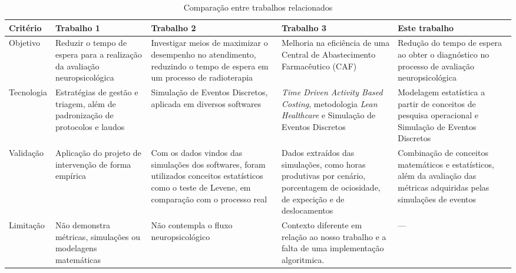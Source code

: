 \documentclass[
    12pt,                %
    openright,           %
    oneside,             %
    a4paper,             %
    english,             %
    brazil               %
]{abntex2}
\begin{document}
\begin{table}[H]
    \centering
    \caption{Comparação entre trabalhos relacionados}
    \label{tab:trabalhos_relacionados}
    
    \tiny %
    
    \setlength{\tabcolsep}{4pt} %
    
    \begin{tabularx}{\textwidth}{p{1.5cm}|Y|Y|Y|Y}
        \toprule
        \textbf{Critério} & \textbf{Trabalho 1} & \textbf{Trabalho 2} & \textbf{Trabalho 3} & \textbf{Este trabalho} \\
        \midrule

        Objetivo 
        & Reduzir o tempo de espera para a realização da avaliação neuropsicológica 
        & Investigar meios de maximizar o desempenho no atendimento, reduzindo o tempo de espera em um processo de radioterapia 
				& Melhoria na eficiência de uma Central de Abastecimento Farmacêutico (CAF)
        & Redução do tempo de espera ao obter o diagnóstico no processo de avaliação neuropsicológica \\
        \midrule

        Tecnologia 
        & Estratégias de gestão e triagem, além de padronização de protocolos e laudos
				& Simulação de Eventos Discretos, aplicada em diversos softwares 
				& \textit{Time Driven Activity Based Costing}, metodologia \textit{Lean Healthcare} e Simulação de Eventos Discretos
        & Modelagem estatística a partir de conceitos de pesquisa operacional e Simulação de Eventos Discretos \\
        \midrule

        Validação 
        & Aplicação do projeto de intervenção de forma empírica
        & Com os dados vindos das simulações dos softwares, foram utilizados conceitos estatísticos como o teste de Levene, em comparação com o processo real
        & Dados extraídos das simulações, como horas produtivas por cenário, porcentagem de ociosidade, de expecição e de deslocamentos
        & Combinação de conceitos matemáticos e estatísticos, além da avaliação das métricas adquiridas pelas simulações de eventos \\
        \midrule

        Limitação 
        & Não demonstra métricas, simulações ou modelagens matemáticas
        & Não contempla o fluxo neuropsicológico
        & Contexto diferente em relação ao nosso trabalho e a falta de uma implementação algoritmica.
        & --- \\
        
        \bottomrule
    \end{tabularx}
    
\end{table}
\end{document}
